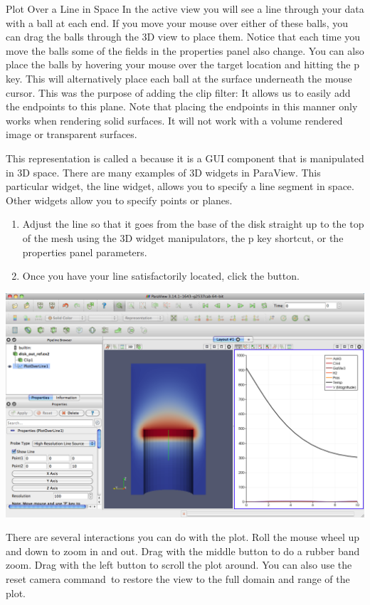 \begin{exercise}{Plot Over a Line in Space}
  In the active view you will see a line through your data with a ball at
  each end.  If you move your mouse over either of these balls, you can
  drag the balls through the 3D view to place them.  Notice that each time
  you move the balls some of the fields in the properties panel also
  change.  You can also place the balls by hovering your mouse over the
  target location and hitting the p key.  This will alternatively place
  each ball at the surface underneath the mouse cursor.  This was the
  purpose of adding the clip filter: It allows us to easily add the
  endpoints to this plane.  Note that placing the endpoints in this manner
  only works when rendering solid surfaces.  It will not work with a volume
  rendered image or transparent surfaces.

  This representation is called a  because it is a GUI
  component that is manipulated in 3D space.  There are many examples of 3D
  widgets in ParaView.  This particular widget, the line widget, allows you
  to specify a line segment in space.  Other widgets allow you to specify
  points or planes.

  \begin{enumerate}
    \restorecounter
  \item Adjust the line so that it goes from the base of the disk straight up
    to the top of the mesh using the 3D widget manipulators, the p key
    shortcut, or the properties panel parameters.
  \item Once you have your line satisfactorily located, click the \apply
    button.
  \end{enumerate}

  \begin{inlinefig}
    \includegraphics[width=\scw]{images/LinePlot2}
  \end{inlinefig}

  There are several interactions you can do with the plot.  Roll the mouse 
  wheel up and down to zoom in and out.  Drag with the middle button
  to do a rubber band zoom.  Drag with the left button to scroll the plot
  around.  You can also use the reset camera command~\resetCamera to restore
  the view to the full domain and range of the plot.
\end{exercise}

